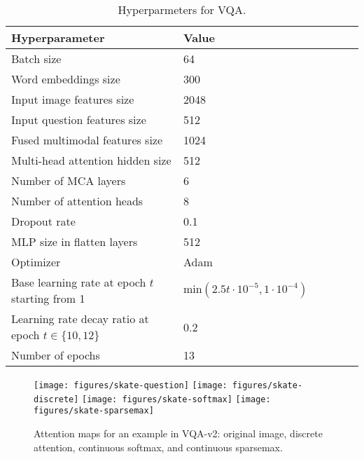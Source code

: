 \documentclass{article}
\begin{document}
\begin{table}[t]
    \caption{Hyperparmeters for VQA.}
    \label{tab:table_hyperparams_VQA}
    \begin{small}
    \begin{center}
    \begin{tabular}{llllll}
        \toprule
        \sc Hyperparameter & \sc Value  \\
        \midrule
        Batch size                  & 64    \\
        Word embeddings size        & 300     \\
        Input image features size   & 2048 \\
        Input question features size & 512 \\
        Fused multimodal features size & 1024 \\
        Multi-head attention hidden size        & 512 \\
Number of MCA layers        & 6 \\
        Number of attention heads   & 8 \\
        Dropout rate                & 0.1 \\
        MLP size in flatten layers  & 512 \\
        Optimizer                   & Adam \\
        Base learning rate at epoch $t$ starting from 1 & $\mathrm{min}(2.5 t \cdot 10^{-5}, 1\cdot 10^{-4})$\\
        Learning rate decay ratio at epoch $t\in \{10,12\}$  & 0.2 \\
        Number of epochs            & 13 \\
        
        \bottomrule
    \end{tabular}
    \end{center}
    \end{small}
\end{table}


\begin{figure*}[t]
\centering
\texttt{[image: figures/skate-question]}
\texttt{[image: figures/skate-discrete]}
\texttt{[image: figures/skate-softmax]}
\texttt{[image: figures/skate-sparsemax]}
\caption{\label{fig:examples_vqa_skate}Attention maps for an example in VQA-v2: original image, discrete attention, continuous softmax, and continuous sparsemax.}
\end{figure*}
\end{document}
